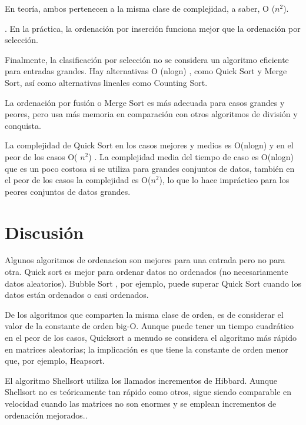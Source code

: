 \documentclass[a4paper]{article}
\begin{document}
En teoría, ambos pertenecen a la misma clase de complejidad, a saber, O ($n^{2}$).

. En la práctica, la ordenación por inserción funciona mejor que la ordenación por selección.

Finalmente, la clasificación por selección no se considera un algoritmo eficiente para entradas grandes. Hay alternativas O (nlogn)
, como Quick Sort y Merge Sort, así como alternativas lineales como Counting Sort. 


La ordenación por fusión o Merge Sort es más adecuada para casos grandes y peores, pero usa más memoria en comparación con otros algoritmos de división y conquista.

\cite{rin}

La complejidad de Quick Sort en los casos mejores y medios  es O(nlogn) y en el peor de los casos O( $n^{2}$)  . La complejidad media del tiempo de caso es O(nlogn) que es un poco costosa si se utiliza para grandes conjuntos de datos, también en el peor de los casos la complejidad es O($n^{2}$), lo que lo hace impráctico para los peores conjuntos de datos grandes.

\section{Discusión}


Algunos algoritmos de ordenacion son mejores para una entrada  pero no para otra. Quick sort es mejor para ordenar datos no ordenados (no necesariamente datos aleatorios). Bubble Sort , por ejemplo, puede superar Quick Sort cuando los datos están ordenados o casi ordenados. 

De los algoritmos que comparten la misma clase de orden, es de considerar el valor de la constante de orden big-O. Aunque puede tener un tiempo cuadrático en el peor de los casos, Quicksort a menudo se considera el algoritmo más rápido en matrices aleatorias; la implicación es que tiene la constante de orden menor que, por ejemplo, Heapsort.


El algoritmo Shellsort  utiliza los llamados incrementos de Hibbard. Aunque Shellsort no es teóricamente tan rápido como otros, sigue siendo comparable en velocidad cuando las matrices no son enormes y se emplean incrementos de ordenación mejorados.\cite{mas}.




\end{document}
